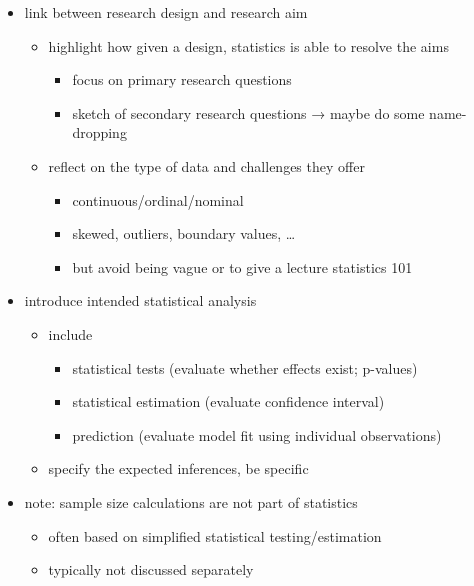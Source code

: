 \documentclass[
]{article}
\providecommand{\tightlist}{%
  \setlength{\itemsep}{0pt}\setlength{\parskip}{0pt}}
\begin{document}
\begin{itemize}
\tightlist
\item
  link between research design and research aim

  \begin{itemize}
  \tightlist
  \item
    highlight how given a design, statistics is able to resolve the aims

    \begin{itemize}
    \tightlist
    \item
      focus on primary research questions
    \item
      sketch of secondary research questions → maybe do some
      name-dropping
    \end{itemize}
  \item
    reflect on the type of data and challenges they offer

    \begin{itemize}
    \tightlist
    \item
      continuous/ordinal/nominal
    \item
      skewed, outliers, boundary values, \ldots{}
    \item
      but avoid being vague or to give a lecture statistics 101
    \end{itemize}
  \end{itemize}
\item
  introduce intended statistical analysis

  \begin{itemize}
  \tightlist
  \item
    include

    \begin{itemize}
    \tightlist
    \item
      statistical tests (evaluate whether effects exist; p-values)
    \item
      statistical estimation (evaluate confidence interval)
    \item
      prediction (evaluate model fit using individual observations)
    \end{itemize}
  \item
    specify the expected inferences, be specific
  \end{itemize}
\item
  note: sample size calculations are not part of statistics

  \begin{itemize}
  \tightlist
  \item
    often based on simplified statistical testing/estimation
  \item
    typically not discussed separately
  \end{itemize}
\end{itemize}
\end{document}
